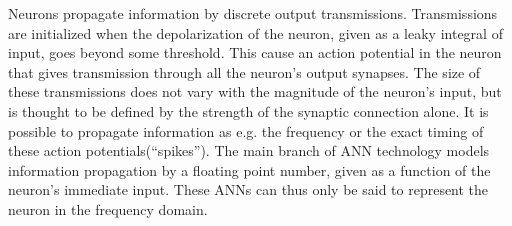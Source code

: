 	Neurons propagate information by discrete output transmissions\cite{CITE}.
	Transmissions are initialized when the depolarization of the neuron, given as a leaky integral of input, goes beyond some threshold\cite{CITE}.
	This cause an action potential in the neuron that gives transmission through all the neuron's output synapses.
	The size of these transmissions does not vary with the magnitude of the neuron's input, 
		but is thought to be defined by the strength of the synaptic connection alone\cite{CITE}. %
	It is possible to propagate information as e.g. the frequency or the exact timing of these action potentials(``spikes'')\cite{ frekvensCITE, ExactTimingCITE}.
	The main branch of ANN technology models information propagation by a floating point number, given as a function of the neuron's immediate input\cite{CITE}. %
	These ANNs can thus only be said to represent the neuron in the frequency domain\cite{FDP_report}.

